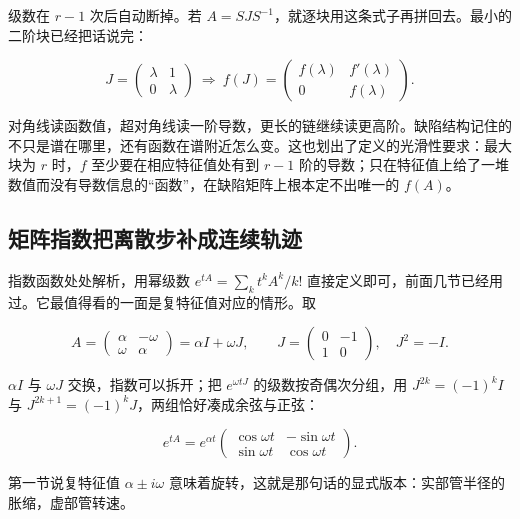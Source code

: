 级数在 \(r-1\) 次后自动断掉。若 \(A=SJS^{-1}\)，就逐块用这条式子再拼回去。最小的二阶块已经把话说完：

\[
J=\begin{pmatrix}\lambda&1\\0&\lambda\end{pmatrix}
\ \Longrightarrow\
f(J)=\begin{pmatrix}f(\lambda)&f'(\lambda)\\0&f(\lambda)\end{pmatrix}.
\]

对角线读函数值，超对角线读一阶导数，更长的链继续读更高阶。缺陷结构记住的不只是谱在哪里，还有函数在谱附近怎么变。这也划出了定义的光滑性要求：最大块为 \(r\) 时，\(f\) 至少要在相应特征值处有到 \(r-1\) 阶的导数；只在特征值上给了一堆数值而没有导数信息的``函数''，在缺陷矩阵上根本定不出唯一的 \(f(A)\)。

\subsection{矩阵指数把离散步补成连续轨迹}

指数函数处处解析，用幂级数 \(e^{tA}=\sum_k t^kA^k/k!\) 直接定义即可，前面几节已经用过。它最值得看的一面是复特征值对应的情形。取

\[
A=\begin{pmatrix}\alpha&-\omega\\\omega&\alpha\end{pmatrix}=\alpha I+\omega J,
\qquad
J=\begin{pmatrix}0&-1\\1&0\end{pmatrix},\quad J^2=-I .
\]

\(\alpha I\) 与 \(\omega J\) 交换，指数可以拆开；把 \(e^{\omega tJ}\) 的级数按奇偶次分组，用 \(J^{2k}=(-1)^kI\) 与 \(J^{2k+1}=(-1)^kJ\)，两组恰好凑成余弦与正弦：

\[
e^{tA}=e^{\alpha t}\begin{pmatrix}\cos\omega t&-\sin\omega t\\\sin\omega t&\cos\omega t\end{pmatrix}.
\]

第一节说复特征值 \(\alpha\pm i\omega\) 意味着旋转，这就是那句话的显式版本：实部管半径的胀缩，虚部管转速。

